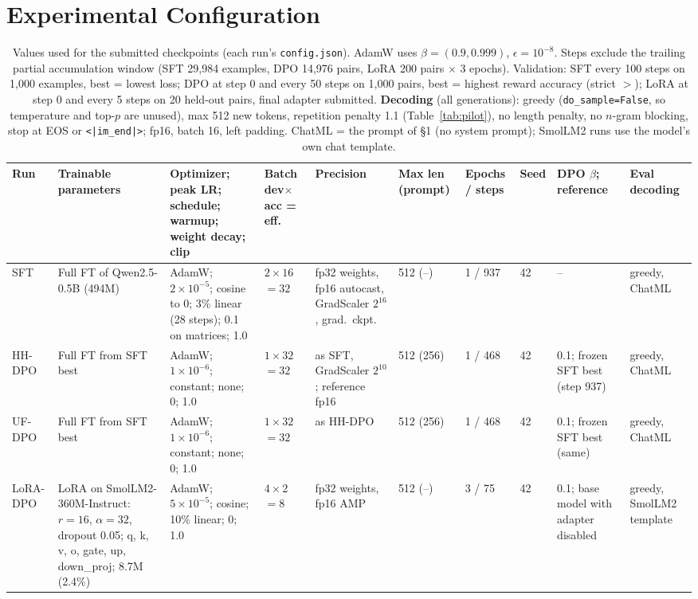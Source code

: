 \documentclass[10pt]{article}
\newcommand{\fp}[1]{\nolinkurl{#1}}
\begin{document}
\section{Experimental Configuration}

\begin{table}[H]\centering\scriptsize\setlength{\tabcolsep}{3pt}
\begin{tabularx}{\linewidth}{@{}L{0.95cm}L{2.3cm}YL{1.1cm}L{1.9cm}L{1.15cm}L{1.1cm}L{0.6cm}L{2.0cm}L{1.6cm}@{}}
\toprule
Run & Trainable parameters & Optimizer; peak LR; schedule; warmup; weight decay; clip & Batch dev$\times$acc = eff. & Precision & Max len (prompt) & Epochs / steps & Seed & DPO $\beta$; reference & Eval decoding \\
\midrule
SFT & Full FT of Qwen2.5-0.5B (494M) & AdamW; $2{\times}10^{-5}$; cosine to 0; 3\% linear (28 steps); 0.1 on matrices; 1.0 & $2\times16$ $=32$ & fp32 weights, fp16 autocast, GradScaler $2^{16}$, grad.\ ckpt. & 512 (--) & 1 / 937 & 42 & -- & greedy, ChatML \\
HH-DPO & Full FT from SFT best & AdamW; $1{\times}10^{-6}$; constant; none; 0; 1.0 & $1\times32$ $=32$ & as SFT, GradScaler $2^{10}$; reference fp16 & 512 (256) & 1 / 468 & 42 & 0.1; frozen SFT best (step 937) & greedy, ChatML \\
UF-DPO & Full FT from SFT best & AdamW; $1{\times}10^{-6}$; constant; none; 0; 1.0 & $1\times32$ $=32$ & as HH-DPO & 512 (256) & 1 / 468 & 42 & 0.1; frozen SFT best (same) & greedy, ChatML \\
LoRA-DPO & LoRA on SmolLM2-360M-Instruct: $r{=}16$, $\alpha{=}32$, dropout 0.05; q, k, v, o, gate, up, down\_proj; 8.7M (2.4\%) & AdamW; $5{\times}10^{-5}$; cosine; 10\% linear; 0; 1.0 & $4\times2$ $=8$ & fp32 weights, fp16 AMP & 512 (--) & 3 / 75 & 42 & 0.1; base model with adapter disabled & greedy, SmolLM2 template \\
\bottomrule
\end{tabularx}
\caption{Values used for the submitted checkpoints (each run's \fp{config.json}). AdamW uses $\beta=(0.9,0.999)$,
$\epsilon=10^{-8}$. Steps exclude the trailing partial accumulation window (SFT 29,984 examples, DPO 14,976 pairs,
LoRA 200 pairs $\times$ 3 epochs). Validation: SFT every 100 steps on 1,000 examples, best = lowest loss; DPO at
step 0 and every 50 steps on 1,000 pairs, best = highest reward accuracy (strict $>$); LoRA at step 0 and every 5
steps on 20 held-out pairs, final adapter submitted. \textbf{Decoding} (all generations): greedy
(\texttt{do\_sample=False}, so temperature and top-$p$ are unused), max 512 new tokens, repetition penalty 1.1 (Table~\ref{tab:pilot}), no
length penalty, no $n$-gram blocking, stop at EOS or \texttt{<|im\_end|>}; fp16, batch 16, left padding. ChatML =
the prompt of \S1 (no system prompt); SmolLM2 runs use the model's own chat template.}
\label{tab:config}
\end{table}
\end{document}
